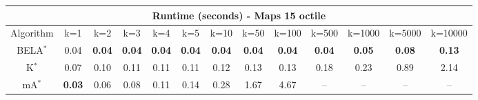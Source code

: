 \begin{tabular}{c|cccccccccccc}\toprule
\multicolumn{13}{c}{Runtime (seconds) - Maps 15 octile}\\ \midrule
Algorithm & k=1 & k=2 & k=3 & k=4 & k=5 & k=10 & k=50 & k=100 & k=500 & k=1000 & k=5000 & k=10000 \\ \midrule
BELA$^*$ & 0.04 & \textbf{0.04} & \textbf{0.04} & \textbf{0.04} & \textbf{0.04} & \textbf{0.04} & \textbf{0.04} & \textbf{0.04} & \textbf{0.04} & \textbf{0.05} & \textbf{0.08} & \textbf{0.13} \\
K$^*$ & 0.07 & 0.10 & 0.11 & 0.11 & 0.11 & 0.12 & 0.13 & 0.13 & 0.18 & 0.23 & 0.89 & 2.14 \\
mA$^*$ & \textbf{0.03} & 0.06 & 0.08 & 0.11 & 0.14 & 0.28 & 1.67 & 4.67 & -- & -- & -- & -- \\ \bottomrule 
\end{tabular}
